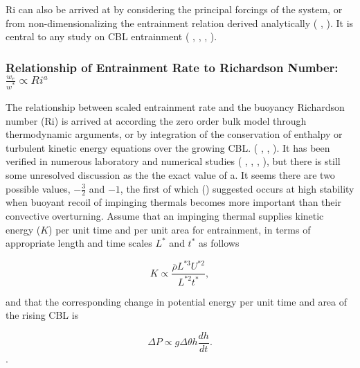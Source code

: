 \acs{Ri} can also be arrived at by considering the principal forcings of the system, or from non-dimensionalizing the entrainment relation  derived analytically (\citeauthor{Tennekes73}  \citeyear{Tennekes73}, \citeauthor{Deardorff72} \citeyear{Deardorff72}). It is central to any study on \acs{CBL} entrainment (\citeauthor{SullMoengStev} \citeyear{SullMoengStev}, \citeauthor{FedConzMir04} \citeyear{FedConzMir04}, \citeauthor{Traum11} \citeyear{Traum11}, \citeauthor{BrooksFowler2} \citeyear{BrooksFowler2}).

\subsubsection{Relationship of Entrainment Rate to Richardson Number: $\frac{w_{e}}{w^{*}} \propto Ri^{a}$}

The relationship between scaled entrainment rate and the buoyancy Richardson number (\acs{Ri}) is arrived at according the zero order bulk
model through thermodynamic arguments, or by integration of the conservation of enthalpy or turbulent kinetic energy equations
over the growing \acs{CBL}. (\citeauthor{Tennekes73} \citeyear{Tennekes73}, \citeauthor{Deardorff79} \citeyear{Deardorff79}, 
\citeauthor{FedConzMir04} \citeyear{FedConzMir04}). It has been verified in numerous laboratory and numerical studies (\citeauthor{DearWill80} \cite{DearWill80}, \citeauthor{SullMoengStev} \cite{SullMoengStev}, \citeauthor{FedConzMir04} \cite{FedConzMir04}, \citeauthor{BrooksFowler2} \cite{BrooksFowler2}), but there is still some 
unresolved discussion as the the exact value of a.  It seems there are two possible values, $-\frac{3}{2}$ and $-1$, the first of which \citeauthor{Turner86} (\citeyear{Turner86}) suggested occurs at high stability when buoyant recoil of impinging thermals becomes more important than their convective overturning. Assume that an impinging thermal supplies kinetic energy ($K$) per unit time and per unit area for entrainment, in terms of appropriate length and time scales $L^{*}$ and $t^{*}$ as follows 

\begin{equation}
K \propto \frac{\overline{\rho} L^{*3} U^{*2}}{L^{*2} t^{*}},
\end{equation}

and that the corresponding change in potential energy per unit time and area of the rising \acs{CBL} is

\begin{equation}
\Delta P \propto g \Delta \theta h \frac{d h}{ dt}.  
\end{equation}.

